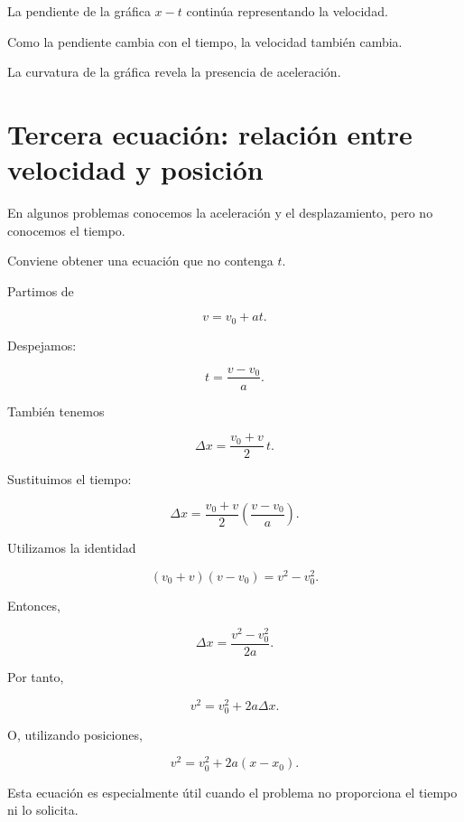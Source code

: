 \begin{interpretacion}
La pendiente de la gráfica \(x-t\) continúa representando la velocidad.

Como la pendiente cambia con el tiempo, la velocidad también cambia.

La curvatura de la gráfica revela la presencia de aceleración.
\end{interpretacion}


\section{Tercera ecuación: relación entre velocidad y posición}

En algunos problemas conocemos la aceleración y el desplazamiento, pero no
conocemos el tiempo.

Conviene obtener una ecuación que no contenga \(t\).

Partimos de

\[ v=v_0+at. \]

Despejamos:

\[ t=\frac{v-v_0}{a}. \]

También tenemos

\[ \Delta x=\frac{v_0+v}{2}\,t. \]

Sustituimos el tiempo:

\[
\Delta x
=
\frac{v_0+v}{2}
\left(
\frac{v-v_0}{a}
\right).
\]

Utilizamos la identidad

\[
(v_0+v)(v-v_0)
=
v^2-v_0^2.
\]

Entonces,

\[
\Delta x
=
\frac{v^2-v_0^2}{2a}.
\]

Por tanto,

\[ \boxed{v^2=v_0^2+2a\Delta x}. \]

O, utilizando posiciones,

\[ \boxed{v^2=v_0^2+2a(x-x_0)}. \]

\begin{idea}
Esta ecuación es especialmente útil cuando el problema no proporciona el
tiempo ni lo solicita.
\end{idea}


